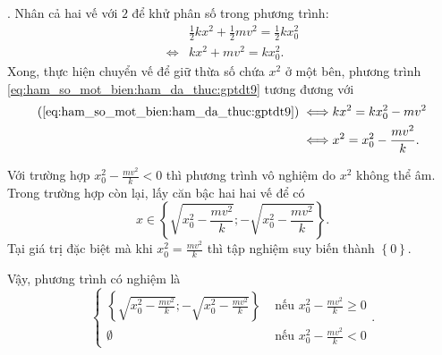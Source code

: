 . Nhân cả hai vế với $2$ để khử phân số trong phương trình:
\begin{align}
   &\frac{1}{2}kx^2 + \frac{1}{2}mv^2 = \frac{1}{2}kx_0^2 \nonumber \\
   \iff &kx^2 + mv^2 = kx_0^2. \label{eq:ham_so_mot_bien:ham_da_thuc:gptdt9}
\end{align}
Xong, thực hiện chuyển vế để giữ thừa số chứa $x^2$ ở một bên, phương trình \ref{eq:ham_so_mot_bien:ham_da_thuc:gptdt9} tương đương với
\begin{align*}
   (\ref{eq:ham_so_mot_bien:ham_da_thuc:gptdt9}) \iff &kx^2 = kx_0^2 - mv^2 \\
   \iff & x^2 = x_0^2 - \frac{mv^2}{k}.
\end{align*}

Với trường hợp $x_0^2 - \frac{mv^2}{k} < 0$ thì phương trình vô nghiệm do $x^2$ không thể âm. Trong trường hợp còn lại, lấy căn bậc hai hai vế để có $$x\in\left\{\sqrt{x_0^2 - \frac{mv^2}{k}}; -\sqrt{x_0^2 - \frac{mv^2}{k}}\right\}.$$ Tại giá trị đặc biệt mà khi $x_0^2 = \frac{mv^2}{k}$ thì tập nghiệm suy biến thành $\left\{0\right\}$.

Vậy, phương trình có nghiệm là 
$$
\begin{cases}
   \left\{\sqrt{x_0^2 - \frac{mv^2}{k}}; -\sqrt{x_0^2 - \frac{mv^2}{k}}\right\} &\text{ nếu } x_0^2 - \frac{mv^2}{k} \geq 0 \\
   \emptyset &\text{ nếu } x_0^2 - \frac{mv^2}{k} < 0
\end{cases}.
$$

